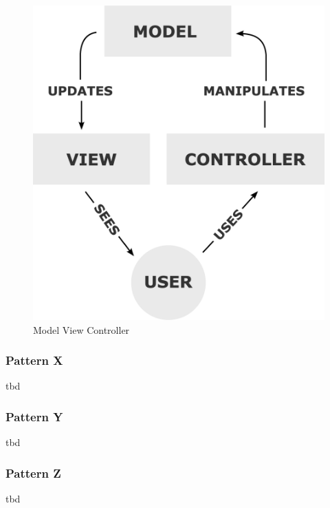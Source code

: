 \begin{figure}[h!]
    \centering
    \caption{Model View Controller}
    \label{fig:mvc}
    \includegraphics[scale=0.15]{assets/wikipedia_mvc_process}
\end{figure}

\color{red}

\subsubsection{Pattern X}
tbd

\subsubsection{Pattern Y}
tbd

\subsubsection{Pattern Z}
tbd

\color{black}
